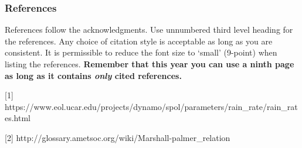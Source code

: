 \documentclass{article} %
\begin{document}
\subsubsection*{References}

References follow the acknowledgments. Use unnumbered third level heading for
the references. Any choice of citation style is acceptable as long as you are
consistent. It is permissible to reduce the font size to `small' (9-point) 
when listing the references. {\bf Remember that this year you can use
a ninth page as long as it contains \emph{only} cited references.}

\small{
[1] https://www.eol.ucar.edu/projects/dynamo/spol/parameters/rain\_rate/rain\_rates.html

[2] http://glossary.ametsoc.org/wiki/Marshall-palmer\_relation
}
\end{document}
